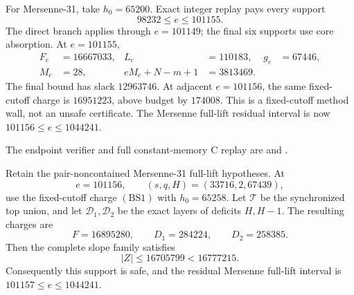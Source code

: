 \documentclass[11pt,a4paper]{amsart}
\numberwithin{equation}{section}
\theoremstyle{remark}
\begin{document}
\begin{remark}
For Mersenne-31, take $h_0=65200$.  Exact integer replay pays every support
\[
 98232\le e\le101155.
\]
The direct branch applies through $e=101149$; the final six supports use
core absorption.  At $e=101155$,
\[
 \begin{aligned}
 F_e&=16667033,& L_e&=110183,& g_e&=67446,\\
 M_e&=28,& eM_e+N-m+1&=3813469.
 \end{aligned}
\]
The final bound has slack $12963746$.  At adjacent $e=101156$, the same
fixed-cutoff charge is $16951223$, above budget by $174008$.  This is a
fixed-cutoff method wall, not an unsafe certificate.  The Mersenne
full-lift residual interval is now $101156\le e\le1044241$.

The endpoint verifier and full constant-memory C replay are
and
.
\end{remark}

\begin{corollary}
\label{cor:full-lift-fixed-cutoff-q2-anchor-repair}
Retain the pair-noncontained Mersenne-31 full-lift hypotheses.  At
\[
 e=101156,\qquad (s,q,H)=(33716,2,67439),
\]
use the fixed-cutoff charge \((\mathrm{BS1})\) with \(h_0=65258\).
Let \(\mathcal T\) be the synchronized top union, and let
\(\mathcal D_1,\mathcal D_2\) be the exact layers of deficits
\(H,H-1\).  The resulting charges are
\[
 F=16895280,\qquad
 D_1=284224,\qquad D_2=258385.
\]
Then the complete slope family satisfies
\[
 |Z|\le16705799<16777215.
\]
Consequently this support is safe, and the residual Mersenne full-lift
interval is \(101157\le e\le1044241\).
\end{corollary}
\end{document}
